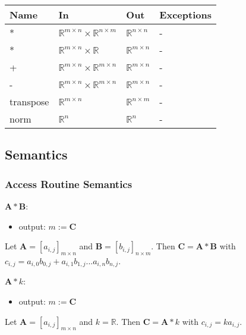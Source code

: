 \documentclass[12pt, titlepage]{article}
\begin{document}
\begin{center}
\begin{tabular}{p{3cm} p{4cm} p{3cm} p{3cm}}
\hline
\textbf{Name} & \textbf{In} & \textbf{Out} & \textbf{Exceptions} \\
\hline
* & $\mathbb{R}^{m \times n} \times \mathbb{R}^{n \times m}$ & $\mathbb{R}^{n \times n}$ & - \\
* & $\mathbb{R}^{m \times n} \times \mathbb{R}$ & $\mathbb{R}^{m \times n}$ & - \\
+ & $\mathbb{R}^{m \times n} \times \mathbb{R}^{m \times n}$ & $\mathbb{R}^{m \times n}$ & - \\
- & $\mathbb{R}^{m \times n} \times \mathbb{R}^{m \times n}$ & $\mathbb{R}^{m \times n}$ & - \\
transpose & $\mathbb{R}^{m \times n}$ & $\mathbb{R}^{n \times m}$ & - \\
norm & $\mathbb{R}^n$ & $\mathbb{R}^n$ & -\\
\hline
\end{tabular}
\end{center}

\subsection{Semantics}

\subsubsection{Access Routine Semantics}

\noindent $\mathbf{A} * \mathbf{B}$:
\begin{itemize}
\item output: $m:=\mathbf{C}$
\end{itemize}
Let $\mathbf{A} = [a_{i,j}]_{m\times n}$ and $\mathbf{B} = [b_{i,j}]_{n\times m}$. Then $\mathbf{C}
= \mathbf{A} * \mathbf{B}$ with $c_{i,j} = a_{i,0} b_{0,j} + a_{i,1} b_{1,j} ...  a_{i,n}b_{n,j}$.
\newline

\noindent $\mathbf{A} * k$:
\begin{itemize}
\item output: $m:=\mathbf{C}$
\end{itemize}
Let $\mathbf{A} = [a_{i,j}]_{m\times n}$ and $k = \mathbb{R}$. Then $\mathbf{C} = \mathbf{A} * k$
with $c_{i,j} = k a_{i,j}$.
\newline
\end{document}
